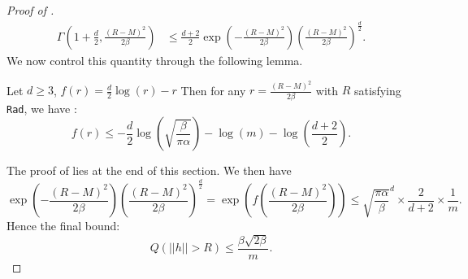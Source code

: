 \begin{noaddcontents}
\begin{proof}[Proof of ]
\begin{align*}
\Gamma\left(1+\frac{d}{2}, \frac{(R-M)^2}{2\beta}\right) & \leq \frac{d+2}{2}\exp\left({-\frac{(R-M)^2}{2\beta}} \right) \left(\frac{(R-M)^2}{2\beta}\right)^{\frac{d}{2}}.
\end{align*}
We now control this quantity through the following lemma.
\begin{lemma}
\label{l: calculus}
Let $d\geq 3$, $f(r)= \frac{d}{2}\log(r) -r$ Then for any $r=\frac{(R-M)^2}{2\beta}$ with $R$ satisfying \texttt{Rad}, we have :
\[f(r) \leq -\frac{d}{2}\log\left(\sqrt{\frac{\beta}{\pi\alpha}}\right) - \log(m)- \log\left(\frac{d+2}{2}\right).\]
\end{lemma}
The proof of  lies at the end of this section.
We then have
\[ \exp\left({-\frac{(R-M)^2}{2\beta}} \right) \left(\frac{(R-M)^2}{2\beta}\right)^{\frac{d}{2}} = \exp\left(f \left( \frac{(R-M)^2}{2\beta} \right)\right) \leq
\sqrt{\frac{\pi\alpha}{\beta}}^{d} \times \frac{2}{d+2} \times \frac{1}{m} . \]
Hence the final bound:
\[ Q(||h||>R)  \leq  \frac{\beta\sqrt{2\beta}}{m} .  \]




\end{proof}
\end{noaddcontents}
